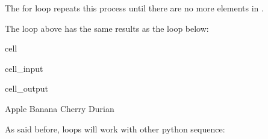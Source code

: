 \documentclass[letterpaper,10pt,english]{jupyterBook}
\begin{document}
\sphinxAtStartPar
The for loop repeats this process until there are no more elements in .

\sphinxAtStartPar
The  loop above has the same results as the  loop below:

\begin{sphinxuseclass}{cell}\begin{sphinxVerbatimInput}

\begin{sphinxuseclass}{cell_input}
\begin{sphinxVerbatim}[commandchars=\\\{\}]
  \PYG{p}{[}\PYG{p}{]}

  
   
      \PYG{p}{[}\PYG{p}{]}
        
\end{sphinxVerbatim}

\end{sphinxuseclass}\end{sphinxVerbatimInput}
\begin{sphinxVerbatimOutput}

\begin{sphinxuseclass}{cell_output}
\begin{sphinxVerbatim}[commandchars=\\\{\}]
Apple
Banana
Cherry
Durian
\end{sphinxVerbatim}

\end{sphinxuseclass}\end{sphinxVerbatimOutput}

\end{sphinxuseclass}
\sphinxAtStartPar
As said before,  loops will work with other python sequence:
\end{document}
